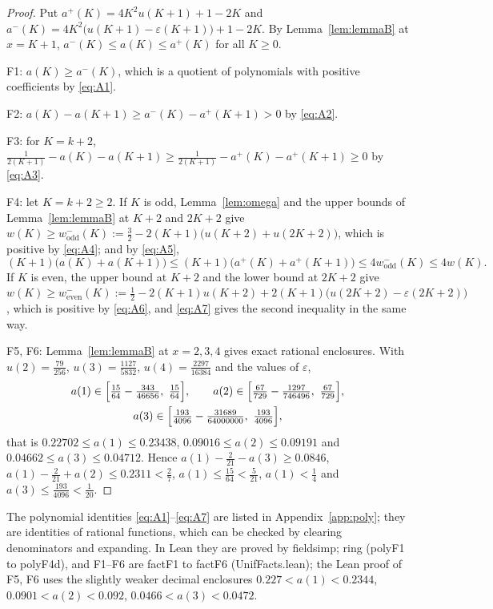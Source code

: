 \documentclass[11pt]{amsart}
\theoremstyle{definition}
\theoremstyle{remark}
\numberwithin{equation}{section}
\newcommand{\aup}{a^{+}}
\newcommand{\alo}{a^{-}}
\newcommand{\leanus}{\textunderscore\allowbreak}
\newcommand{\lean}[1]{{\ttfamily\let\_\leanus #1}}
\begin{document}
\begin{proof}
Put $\aup(K)=4K^2u(K+1)+1-2K$ and $\alo(K)=4K^2\bigl(u(K+1)-\varepsilon(K+1)\bigr)+1-2K$. By
Lemma~\ref{lem:lemmaB} at $x=K+1$, $\alo(K)\le a(K)\le\aup(K)$ for all $K\ge0$.

F1: $a(K)\ge\alo(K)$, which is a quotient of polynomials with positive coefficients by \eqref{eq:A1}.

F2: $a(K)-a(K+1)\ge\alo(K)-\aup(K+1)>0$ by \eqref{eq:A2}.

F3: for $K=k+2$, $\frac1{2(K+1)}-a(K)-a(K+1)\ge\frac1{2(K+1)}-\aup(K)-\aup(K+1)\ge0$ by \eqref{eq:A3}.

F4: let $K=k+2\ge2$. If $K$ is odd, Lemma~\ref{lem:omega} and the upper bounds of Lemma~\ref{lem:lemmaB}
at $K+2$ and $2K+2$ give $w(K)\ge w^-_{\mathrm{odd}}(K):=\frac32-2(K+1)\bigl(u(K+2)+u(2K+2)\bigr)$,
which is positive by \eqref{eq:A4}; and by \eqref{eq:A5},
\[
  (K+1)\bigl(a(K)+a(K+1)\bigr)\le(K+1)\bigl(\aup(K)+\aup(K+1)\bigr)\le4w^-_{\mathrm{odd}}(K)\le4w(K).
\]
If $K$ is even, the upper bound at $K+2$ and the lower bound at $2K+2$ give
$w(K)\ge w^-_{\mathrm{even}}(K):=\frac12-2(K+1)u(K+2)+2(K+1)\bigl(u(2K+2)-\varepsilon(2K+2)\bigr)$, which is
positive by \eqref{eq:A6}, and \eqref{eq:A7} gives the second inequality in the same way.

F5, F6: Lemma~\ref{lem:lemmaB} at $x=2,3,4$ gives exact rational enclosures. With
$u(2)=\frac{79}{256}$, $u(3)=\frac{1127}{5832}$, $u(4)=\frac{2297}{16384}$ and the values of $\varepsilon$,
\begin{gather*}
  a(1)\in\Bigl[\tfrac{15}{64}-\tfrac{343}{46656},\ \tfrac{15}{64}\Bigr],\qquad
  a(2)\in\Bigl[\tfrac{67}{729}-\tfrac{1297}{746496},\ \tfrac{67}{729}\Bigr],\\
  a(3)\in\Bigl[\tfrac{193}{4096}-\tfrac{31689}{64000000},\ \tfrac{193}{4096}\Bigr],
\end{gather*}
that is $0.22702\le a(1)\le0.23438$, $0.09016\le a(2)\le0.09191$ and $0.04662\le a(3)\le0.04712$. Hence
$a(1)-\frac2{21}-a(3)\ge0.0846$, $a(1)-\frac2{21}+a(2)\le0.2311<\frac27$, $a(1)\le\frac{15}{64}<\frac5{21}$,
$a(1)<\frac14$ and $a(3)\le\frac{193}{4096}<\frac1{20}$.
\end{proof}

The polynomial identities \eqref{eq:A1}--\eqref{eq:A7} are listed in Appendix~\ref{app:poly}; they are
identities of rational functions, which can be checked by clearing denominators and expanding. In
Lean they are proved by \lean{field\_simp; ring} (\lean{poly\_F1} to \lean{poly\_F4d}), and F1--F6 are
\lean{factF1} to \lean{factF6} (\lean{UnifFacts.lean}); the Lean proof of F5, F6 uses the slightly weaker
decimal enclosures $0.227<a(1)<0.2344$, $0.0901<a(2)<0.092$, $0.0466<a(3)<0.0472$.
\end{document}
